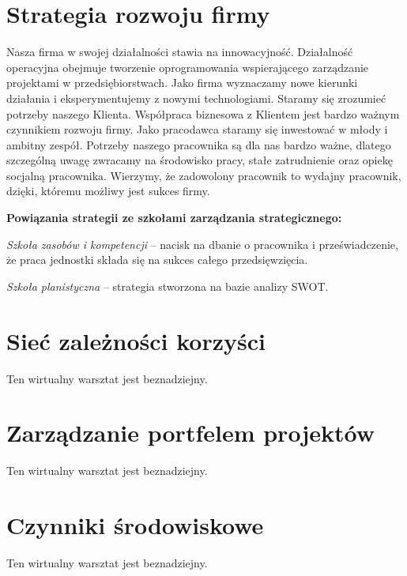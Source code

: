 
\section{Strategia rozwoju firmy}

Nasza firma w swojej działalności stawia na innowacyjność. Działalność operacyjna obejmuje tworzenie oprogramowania wspierającego zarządzanie projektami w przedsiębiorstwach. Jako firma wyznaczamy nowe kierunki działania i eksperymentujemy z nowymi technologiami. Staramy się zrozumieć potrzeby naszego Klienta. Współpraca biznesowa z Klientem jest bardzo ważnym czynnikiem rozwoju firmy. 
Jako pracodawca staramy się inwestować w młody i ambitny zespół. Potrzeby naszego pracownika są dla nas bardzo ważne, dlatego szczególną uwagę zwracamy na środowisko pracy, stałe zatrudnienie oraz opiekę socjalną pracownika. Wierzymy, że zadowolony pracownik to wydajny pracownik, dzięki, któremu możliwy jest sukces firmy.  

\textbf{Powiązania strategii ze szkołami zarządzania strategicznego:}

\textit{Szkoła zasobów i kompetencji} – nacisk na dbanie o pracownika i przeświadczenie, że praca jednostki składa się na sukces całego przedsięwzięcia.

\textit{Szkoła planistyczna} – strategia stworzona na bazie analizy SWOT.



\section{Sieć zależności korzyści}

Ten wirtualny warsztat jest beznadziejny.


\section{Zarządzanie portfelem projektów}

Ten wirtualny warsztat jest beznadziejny.


\section{Czynniki środowiskowe}

Ten wirtualny warsztat jest beznadziejny.


